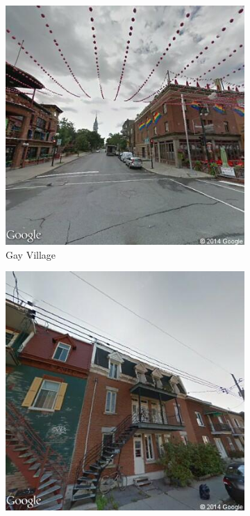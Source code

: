 \documentclass{acm_proc_article-sp}
\begin{document}
\begin{figure}[h!]
	\begin{subfigure}[b]{0.3\linewidth}
		\includegraphics[width=\linewidth]{gayvillage.png}
		\caption{Gay Village}
		\label{fig:gayvillage}
	\end{subfigure}
\begin{subfigure}[b]{0.3\linewidth}
		\includegraphics[width=\linewidth]{plateau.png}

\end{subfigure}
\end{figure}
\end{document}
